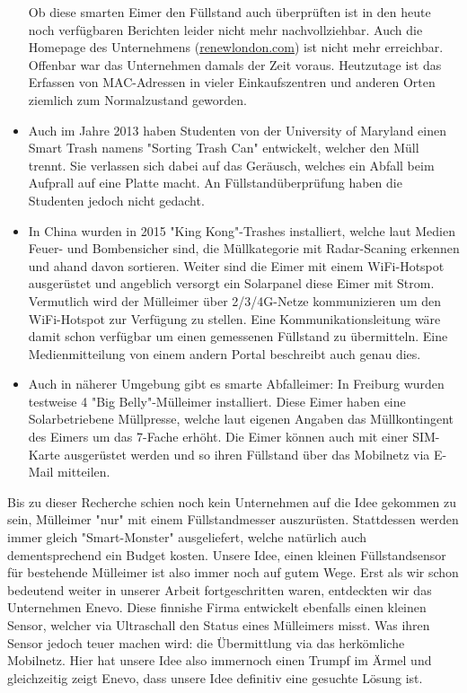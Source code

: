 \begin{itemize}
  Ob diese smarten Eimer den Füllstand auch überprüften ist in den heute noch verfügbaren Berichten leider nicht mehr nachvollziehbar. Auch die Homepage des Unternehmens (\url{renewlondon.com}) ist nicht mehr erreichbar. Offenbar war das Unternehmen damals der Zeit voraus. Heutzutage ist das Erfassen von MAC-Adressen in vieler Einkaufszentren und anderen Orten ziemlich zum Normalzustand geworden. 
  \item Auch im Jahre 2013 haben Studenten von der University of Maryland einen Smart Trash namens "Sorting Trash Can"\autocite{market:sortingTrashCan} entwickelt, welcher den Müll trennt. Sie verlassen sich dabei auf das Geräusch, welches ein Abfall beim Aufprall auf eine Platte macht. An Füllstandüberprüfung haben die Studenten jedoch nicht gedacht.
  \item In China wurden in 2015 "King Kong"-Trashes\autocite{market:ChinaTrash} installiert, welche laut Medien Feuer- und Bombensicher sind, die Müllkategorie mit Radar-Scaning erkennen und ahand davon sortieren. Weiter sind die Eimer mit einem WiFi-Hotspot ausgerüstet und angeblich versorgt ein Solarpanel diese Eimer mit Strom. Vermutlich wird der Mülleimer über 2/3/4G-Netze kommunizieren um den WiFi-Hotspot zur Verfügung zu stellen. Eine Kommunikationsleitung wäre damit schon verfügbar um einen gemessenen Füllstand zu übermitteln. Eine Medienmitteilung von einem andern Portal beschreibt auch genau dies\autocite{market:ChinaTrash2}.
  
  \item Auch in näherer Umgebung gibt es smarte Abfalleimer: In Freiburg wurden testweise 4 "Big Belly"-Mülleimer installiert\autocite{market:BigBelly}. Diese Eimer haben eine Solarbetriebene Müllpresse, welche laut eigenen Angaben das Müllkontingent des Eimers um das 7-Fache erhöht. Die Eimer können auch mit einer SIM-Karte ausgerüstet werden und so ihren Füllstand über das Mobilnetz via E-Mail mitteilen.
\end{itemize}

Bis zu dieser Recherche schien noch kein Unternehmen auf die Idee gekommen zu sein, Mülleimer "nur" mit einem Füllstandmesser auszurüsten. Stattdessen werden immer gleich "Smart-Monster" ausgeliefert, welche natürlich auch dementsprechend ein Budget kosten. Unsere Idee, einen kleinen Füllstandsensor für bestehende Mülleimer ist also immer noch auf gutem Wege. Erst als wir schon bedeutend weiter in unserer Arbeit fortgeschritten waren, entdeckten wir das Unternehmen Enevo\autocite{market:Enevo}. Diese finnishe Firma entwickelt ebenfalls einen kleinen Sensor, welcher via Ultraschall den Status eines Mülleimers misst. Was ihren Sensor jedoch teuer machen wird: die Übermittlung via das herkömliche Mobilnetz. Hier hat unsere Idee also immernoch einen Trumpf im Ärmel und gleichzeitig zeigt Enevo, dass unsere Idee definitiv eine gesuchte Lösung ist.

